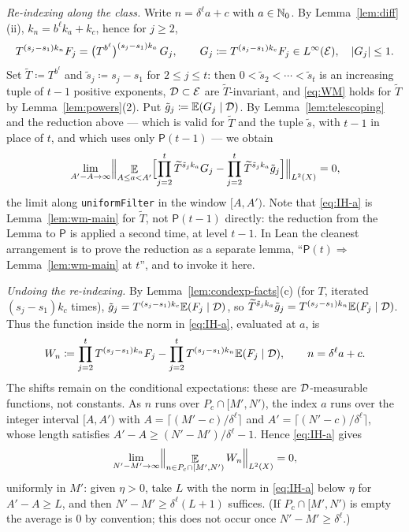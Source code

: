 \emph{Re-indexing along the class.}  Write $n = \delta^{\ell} a + c$ with $a \in \mathbb{N}_0$.  By
Lemma~\ref{lem:diff}(ii), $k_n = b^{\ell} k_a + k_c$, hence for $j \geq 2$,
\[
  T^{(s_j - s_1)k_n} F_j = \bigl(T^{b^{\ell}}\bigr)^{(s_j - s_1)k_a}\, G_j ,
  \qquad G_j \coloneqq T^{(s_j - s_1)k_c} F_j \in L^{\infty}(\mathcal{E}) , \quad \lvert G_j \rvert \leq 1 .
\]
Set $\widetilde T \coloneqq T^{b^{\ell}}$ and $\tilde s_j \coloneqq s_j - s_1$ for
$2 \leq j \leq t$: then $0 < \tilde s_2 < \cdots < \tilde s_t$ is an increasing tuple of
$t - 1$ positive exponents, $\mathcal{D} \subset \mathcal{E}$ are $\widetilde T$-invariant, and \eqref{eq:WM}
holds for $\widetilde T$ by Lemma~\ref{lem:powers}(2).  Put
$\tilde g_j \coloneqq \mathbb{E}(G_j \mid \mathcal{D})$.  By Lemma~\ref{lem:telescoping} and the reduction
above --- which is valid for $\widetilde T$ and the tuple $\tilde s$, with $t-1$ in place of $t$,
and which uses only $\mathsf P(t-1)$ --- we obtain
\begin{equation}
  \label{eq:IH-a}
  \lim_{A' - A \to \infty} \Bigl\lVert \mathop{\mathbb{E}}_{A \leq a < A'} \Bigl[
    \prod_{j=2}^{t} \widetilde T^{\tilde s_j k_a} G_j - \prod_{j=2}^{t} \widetilde T^{\tilde s_j k_a} \tilde g_j
  \Bigr] \Bigr\rVert_{L^2(X)} = 0 ,
\end{equation}
the limit along \texttt{uniformFilter} in the window $[A,A')$.  Note that \eqref{eq:IH-a} is
Lemma~\ref{lem:wm-main} for $\widetilde T$, not $\mathsf P(t-1)$ directly: the reduction from
the Lemma to $\mathsf P$ is applied a second time, at level $t-1$.  In Lean the cleanest
arrangement is to prove the reduction as a separate lemma, ``$\mathsf P(t) \Rightarrow$
Lemma~\ref{lem:wm-main} at $t$'', and to invoke it here.

\emph{Undoing the re-indexing.}  By Lemma~\ref{lem:condexp-facts}(c) (for $T$, iterated
$(s_j - s_1)k_c$ times), $\tilde g_j = T^{(s_j - s_1)k_c}\mathbb{E}(F_j\mid\mathcal{D})$, so
$\widetilde T^{\tilde s_j k_a}\tilde g_j = T^{(s_j-s_1)k_n}\mathbb{E}(F_j\mid\mathcal{D})$.  Thus the
function inside the norm in \eqref{eq:IH-a}, evaluated at $a$, is
\[
  W_n \coloneqq \prod_{j=2}^{t} T^{(s_j-s_1)k_n}F_j - \prod_{j=2}^{t} T^{(s_j-s_1)k_n}\mathbb{E}(F_j\mid\mathcal{D}) ,
  \qquad n = \delta^{\ell} a + c .
\]
The shifts remain on the conditional expectations: these are $\mathcal{D}$-measurable functions, not
constants.  As $n$ runs over $P_c \cap [M',N')$, the index $a$ runs over the integer interval
$[A, A')$ with $A = \lceil (M'-c)/\delta^{\ell} \rceil$ and $A' = \lceil (N'-c)/\delta^{\ell} \rceil$,
whose length satisfies $A' - A \geq (N'-M')/\delta^{\ell} - 1$.  Hence \eqref{eq:IH-a} gives
\begin{equation}
  \label{eq:IH}
  \lim_{N'-M'\to\infty} \Bigl\lVert \mathop{\mathbb{E}}_{n \in P_c \cap [M',N')} W_n \Bigr\rVert_{L^2(X)} = 0 ,
\end{equation}
uniformly in $M'$: given $\eta > 0$, take $L$ with the norm in \eqref{eq:IH-a} below $\eta$ for
$A' - A \geq L$, and then $N' - M' \geq \delta^{\ell}(L+1)$ suffices.  (If
$P_c \cap [M',N')$ is empty the average is $0$ by convention; this does not occur once
$N' - M' \geq \delta^{\ell}$.)

